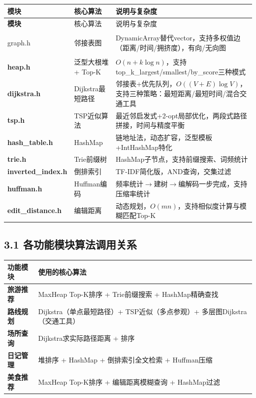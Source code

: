 \documentclass[12pt,a4paper]{article}
\begin{document}
\begin{center}
\begin{longtable}{>{\bfseries}l p{3.2cm} p{6.5cm}}
    \toprule
    模块 & 核心算法 & 说明与复杂度 \\
    \midrule
    \endfirsthead
    \toprule
    模块 & 核心算法 & 说明与复杂度 \\
    \midrule
    \endhead
    \bottomrule
    \endlastfoot

    graph.h & 邻接表图 & DynamicArray替代vector，支持多权值边（距离/时间/拥挤度），有向/无向图 \\

    heap.h & 泛型大根堆 + Top-K & $O(n + k\log n)$，支持top\_k\_largest/smallest/by\_score三种模式 \\

    dijkstra.h & Dijkstra最短路径 & 邻接表+优先队列，$O((V+E)\log V)$，支持三种策略：最短距离/最短时间/混合交通工具 \\

    tsp.h & TSP近似算法 & 最近邻启发式+2-opt局部优化，两段式路径拼接，时间与精度平衡 \\

    hash\_table.h & HashMap & 链地址法，动态扩容，泛型模板+IntHashMap特化 \\

    trie.h & Trie前缀树 & HashMap子节点，支持前缀搜索、词频统计 \\

    inverted\_index.h & 倒排索引 & TF-IDF简化版，AND查询，交集过滤 \\

    huffman.h & Huffman编码 & 频率统计$\to$建树$\to$编解码一步完成，支持压缩率统计 \\

    edit\_distance.h & 编辑距离 & 动态规划，$O(mn)$，支持相似度计算与模糊匹配Top-K \\
\end{longtable}
\end{center}

\subsection*{3.1 各功能模块算法调用关系}

\begin{center}
\begin{tabular}{>{\bfseries}l l}
    \toprule
    功能模块 & 使用的核心算法 \\
    \midrule
    旅游推荐 & MaxHeap Top-K排序 + Trie前缀搜索 + HashMap精确查找 \\
    路线规划 & Dijkstra（单点最短路径）+ TSP近似（多点参观）+ 多层图Dijkstra（交通工具）\\
    场所查询 & Dijkstra求实际路径距离 + 排序 \\
    日记管理 & 堆排序 + HashMap + 倒排索引全文检索 + Huffman压缩 \\
    美食推荐 & MaxHeap Top-K排序 + 编辑距离模糊查询 + HashMap过滤 \\
    \bottomrule
\end{tabular}
\end{center}
\end{document}
